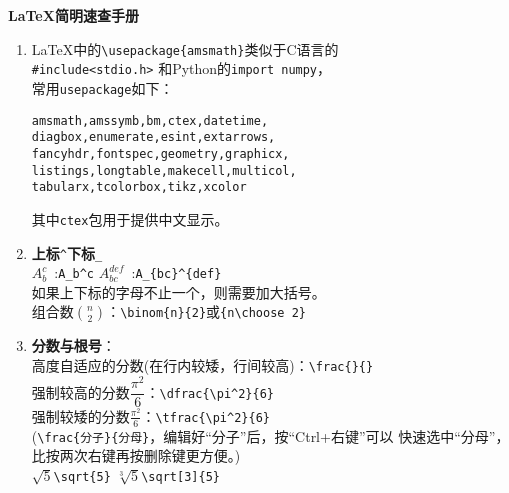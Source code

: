 \documentclass{article}
\newcommand{\q}{\quad}
\begin{document}
\begin{center}
    {\Large \textbf{\LaTeX 简明速查手册} }
\end{center}


\begin{multicols}{2}
    \begin{enumerate}

        \item \LaTeX 中的\verb|\usepackage{amsmath}|类似于C语言的\\ \verb|#include<stdio.h>|
              和Python的\verb|import numpy|，\\ 常用\verb|usepackage|如下：
              \begin{lstlisting}
amsmath,amssymb,bm,ctex,datetime, 
diagbox,enumerate,esint,extarrows,
fancyhdr,fontspec,geometry,graphicx,
listings,longtable,makecell,multicol,
tabularx,tcolorbox,tikz,xcolor  
\end{lstlisting}
              其中\verb|ctex|包用于提供中文显示。

        \item \textbf{上标}\q \verb|^|\quad \textbf{下标}\q \verb|_| \\
              $ A_b^c $\ :\q \verb|A_b^c| \q\q\q\q
              $ A_{bc}^{def} $\ :\q \verb|A_{bc}^{def}| \\
              如果上下标的字母不止一个，则需要加大括号。\\
              组合数$ \binom{n}{2} $：\verb|\binom{n}{2}|或\verb|{n\choose 2}|

        \item \textbf{分数与根号}：\\
              高度自适应的分数(在行内较矮，行间较高)：\verb|\frac{}{}|\\
              强制较高的分数$ \dfrac{\pi^2}{6} $：\verb|\dfrac{\pi^2}{6}| \\
              强制较矮的分数$ \tfrac{\pi^2}{6} $：\verb|\tfrac{\pi^2}{6}| \\
              (\verb|\frac{分子}{分母}|，编辑好“分子”后，按“Ctrl+右键”可以
              快速选中“分母”，比按两次右键再按删除键更方便。)\\
              $ \sqrt{5} $\q \verb|\sqrt{5}| \q\q\q\q
              $ \sqrt[3]{5} $\q \verb|\sqrt[3]{5}|


\end{enumerate}
\end{multicols}
\end{document}
